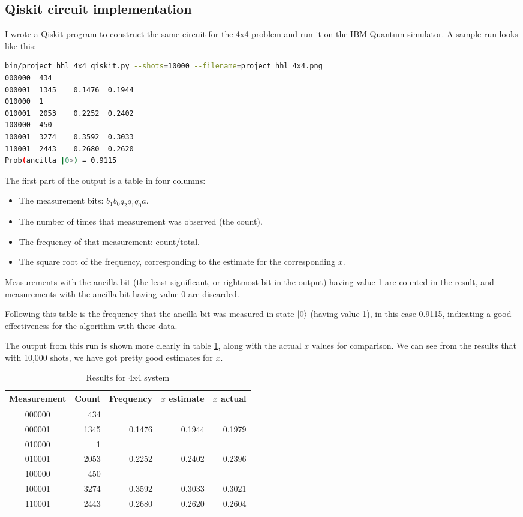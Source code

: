 \documentclass[12pt]{extarticle}
\begin{document}
\subsection{Qiskit circuit implementation}

I wrote a Qiskit program to construct the same circuit for the 4x4 problem and run it on the IBM Quantum simulator.
A sample run looks like this:

\begin{lstlisting}[language=Bash]
bin/project_hhl_4x4_qiskit.py --shots=10000 --filename=project_hhl_4x4.png
000000  434
000001  1345    0.1476  0.1944
010000  1
010001  2053    0.2252  0.2402
100000  450
100001  3274    0.3592  0.3033
110001  2443    0.2680  0.2620
Prob(ancilla |0>) = 0.9115
\end{lstlisting}

The first part of the output is a table in four columns:
\begin{itemize}
\item The measurement bits: $b_1b_0q_2q_1q_0a$.
\item The number of times that measurement was observed (the count).
\item The frequency of that measurement: count/total.
\item The square root of the frequency, corresponding to the estimate for the corresponding $x$.
\end{itemize}

Measurements with the ancilla bit (the least significant, or rightmost bit in the output) having value 1 are counted in the result,
and measurements with the ancilla bit having value 0 are discarded.

Following this table is the frequency that the ancilla bit was measured in state $\ket{0}$ (having value 1), in this case 0.9115,
indicating a good effectiveness for the algorithm with these data.

The output from this run is shown more clearly in table \ref{tab:results4x4}, along with the actual $x$ values for comparison.
We can see from the results that with 10,000 shots, we have got pretty good estimates for $x$.

\begin{table}[h]
\begin{center}
\begin{tabular}{|c|r|r|r|r|}
\hline
Measurement & Count & Frequency & $x$ estimate & $x$ actual \\
\hline
000000 &  434 & & & \\
000001 & 1345 & 0.1476 & 0.1944 & 0.1979 \\
010000 &    1 & & & \\
010001 & 2053 & 0.2252 & 0.2402 & 0.2396 \\
100000 &  450 & & & \\
100001 & 3274 & 0.3592 & 0.3033 & 0.3021 \\
110001 & 2443 & 0.2680 & 0.2620 & 0.2604 \\
\hline
\end{tabular}
\caption{Results for 4x4 system}
\label{tab:results4x4}
\end{center}
\end{table}
\end{document}

